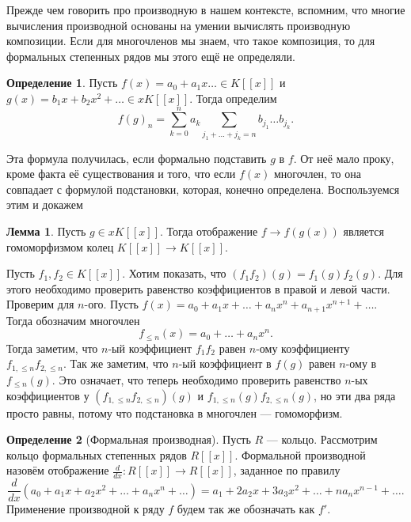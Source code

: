 \documentclass[10pt,a4paper,oneside]{book} %
\theoremstyle{definition}
\newtheorem*{defn}{Определение}
\newtheorem{lem}{Лемма}
\def\dfn{\begin{defn}}
\def\edfn{\end{defn}}
\def\lm{\begin{lem}}
\def\elm{\end{lem}}
\begin{document}
Прежде чем говорить про производную в нашем контексте, вспомним, что многие вычисления производной основаны на умении вычислять производную композиции. Если для многочленов мы знаем, что такое композиция, то для формальных степенных рядов мы этого ещё не определяли.

\dfn Пусть $f(x)=a_0+ a_1x\dots\in K[[x]]$ и $g(x)= b_1x+b_2x^2+\dots \in xK[[x]]$. Тогда определим 
$$f(g)_n= \sum_{k=0}^n a_k\sum_{j_1+\dots+j_k=n} b_{j_1}\dots b_{j_k}.$$
\edfn

Эта формула получилась, если формально подставить $g$ в $f$. От неё мало проку, кроме факта её существования и того, что если $f(x)$ многочлен, то она совпадает с формулой подстановки, которая, конечно определена. Воспользуемся этим и докажем

\lm Пусть $g\in xK[[x]]$. Тогда отображение $f \to f(g(x))$ является гомоморфизмом колец $K[[x]]\to K[[x]]$.
\elm
\proof Пусть $f_1, f_2 \in K[[x]]$. Хотим показать, что $(f_1f_2)(g)=f_1(g)f_2(g)$. Для этого необходимо проверить равенство коэффициентов в правой и левой части. Проверим для $n$-ого. Пусть $f(x)= a_0+a_1x+\dots+a_nx^n+a_{n+1}x^{n+1}+\dots$. Тогда обозначим многочлен 
$$f_{\leq n}(x)=a_0+\dots+a_nx^n.$$
Тогда заметим, что $n$-ый коэффициент $f_1f_2$ равен $n$-ому коэффициенту $f_{1,\leq n}f_{2,\leq n}$. Так же заметим, что $n$-ый коэффициент в $f(g)$ равен $n$-ому в $f_{\leq n}(g)$. Это означает, что теперь необходимо проверить равенство $n$-ых коэффициентов у $(f_{1,\leq n}f_{2,\leq n})(g)$ и $f_{1,\leq n}(g)f_{2,\leq n}(g)$, но эти два ряда просто равны, потому что подстановка в многочлен --- гомоморфизм. \endproof 

\dfn[Формальная производная] Пусть $R$ --- кольцо. Рассмотрим кольцо формальных степенных рядов $R[[x]]$. Формальной производной назовём отображение
$\frac{d}{dx}\colon R[[x]]\to R[[x]]$, заданное по правилу
$$\frac{d}{dx}(a_0+a_1x+a_2x^2+\dots+a_nx^n+\dots) = a_1+2a_2x+3a_3x^2+\dots+na_nx^{n-1}+\dots.$$
Применение производной к ряду $f$ будем так же обозначать как $f'$.
\edfn
\end{document}
